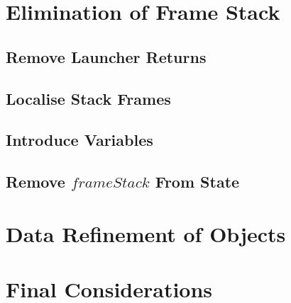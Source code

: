 

\section{Elimination of Frame Stack}
\label{elimination-of-frame-stack-section}



\subsection{Remove Launcher Returns}
\label{remove-launcher-returns-subsection}



\subsection{Localise Stack Frames}
\label{localise-stack-frames-subsection}



\subsection{Introduce Variables}
\label{introduce-variables-subsection}



\subsection{Remove \texorpdfstring{$frameStack$}{frameStack} From
  State}
\label{remove-frameStack-from-state-subsection}



\section{Data Refinement of Objects}
\label{data-refinement-of-objects-section}



\section{Final Considerations}
\label{compilation-final-considerations-section}